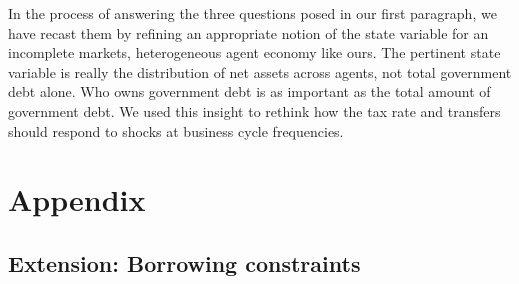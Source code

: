 \documentclass[thmsb,11pt]{article}
\begin{document}
 In the process of answering the three questions posed in our first paragraph, we have recast them by refining an appropriate notion
 of the state variable for an incomplete markets, heterogeneous agent economy like ours.  The pertinent state variable is  really the distribution
 of net assets across agents, not total government debt alone.  Who owns government debt is as important as the total amount of  government debt. 
 We used  this insight to rethink  how the tax rate and transfers should respond to shocks at business cycle frequencies.   
 
 
  
  



\appendix
\section{Appendix}

\subsection{Extension: Borrowing constraints}
\label{appndx: credit limits and RE}
%
\end{document}
